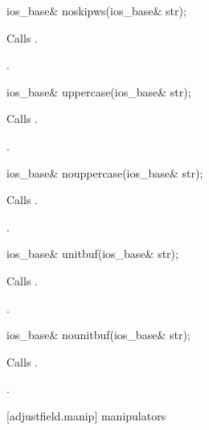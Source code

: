 %
\begin{itemdecl}
ios_base& noskipws(ios_base& str);
\end{itemdecl}

\begin{itemdescr}
\pnum
\effects
Calls
.

\pnum
\returns
{}.
\end{itemdescr}

%
\begin{itemdecl}
ios_base& uppercase(ios_base& str);
\end{itemdecl}

\begin{itemdescr}
\pnum
\effects
Calls
.

\pnum
\returns
{}.
\end{itemdescr}

%
\begin{itemdecl}
ios_base& nouppercase(ios_base& str);
\end{itemdecl}

\begin{itemdescr}
\pnum
\effects
Calls
.

\pnum
\returns
{}.
\end{itemdescr}

%
\begin{itemdecl}
ios_base& unitbuf(ios_base& str);
\end{itemdecl}

\begin{itemdescr}
\pnum
\effects
Calls
.

\pnum
\returns
{}.
\end{itemdescr}

%
\begin{itemdecl}
ios_base& nounitbuf(ios_base& str);
\end{itemdecl}

\begin{itemdescr}
\pnum
\effects
Calls
.

\pnum
\returns
{}.
\end{itemdescr}

[adjustfield.manip]{ manipulators}


